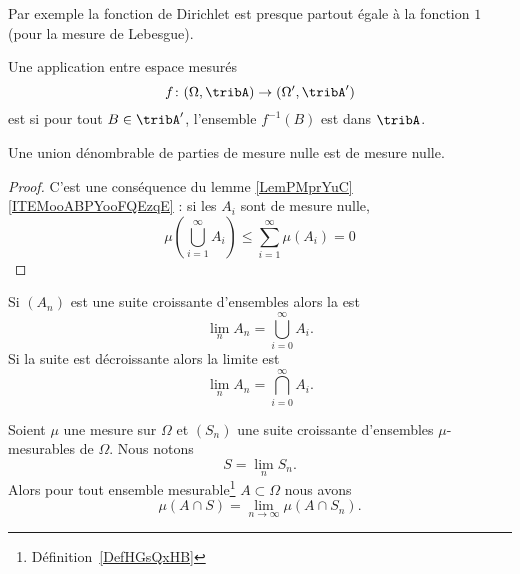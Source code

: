 Par exemple la fonction de Dirichlet est presque partout égale à la fonction \( 1\) (pour la mesure de Lebesgue).

\begin{definition}
	Une application entre espace mesurés
	\begin{equation}
		f\colon (\Omega,\tribA)\to (\Omega',\tribA')
	\end{equation}
	est  si pour tout \( B\in\tribA'\), l'ensemble \( f^{-1}(B)\) est dans \( \tribA\).
\end{definition}

\begin{lemma}   \label{LemIDITgAy}
	Une union dénombrable de parties de mesure nulle est de mesure nulle.
\end{lemma}

\begin{proof}
	C'est une conséquence du lemme \ref{LemPMprYuC}\ref{ITEMooABPYooFQEzqE} : si les \( A_i\) sont de mesure nulle,
	\begin{equation}
		\mu\left( \bigcup_{i=1}^{\infty}A_i \right)\leq\sum_{i=1}^{\infty} \mu(A_i)=0
	\end{equation}
\end{proof}

\begin{definition}
	Si \( (A_n)\) est une suite croissante d'ensembles alors la  est
	\begin{equation}
		\lim_nA_n=\bigcup_{i=0}^{\infty}A_i.
	\end{equation}
	Si la suite est décroissante alors la limite est
	\begin{equation}
		\lim_nA_n=\bigcap_{i=0}^{\infty}A_i.
	\end{equation}
\end{definition}


\begin{proposition} \label{PropAFNPSsm}
	Soient \( \mu\) une mesure sur \( \Omega\) et \( (S_n)\) une suite croissante d'ensembles \( \mu\)-mesurables de \( \Omega\). Nous notons
	\begin{equation}
		S=\lim_nS_n.
	\end{equation}
	Alors pour tout ensemble mesurable\footnote{Définition~\ref{DefHGsQxHB}} \( A\subset\Omega\) nous avons
	\begin{equation}
		\mu(A\cap S)=\lim_{n\to \infty} \mu(A\cap S_n).
	\end{equation}
\end{proposition}

